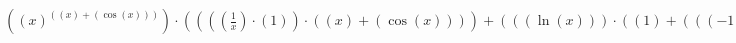 \documentclass{article}
\begin{document}
$((x)^{((x) + (\cos{(x)}))})\cdot((((\frac{1}{x})\cdot(1))\cdot((x) + (\cos{(x)}))) + (((\ln{(x)}))\cdot((1) + (((-1)\cdot(\sin{(x)}))\cdot(1)))))$
\end{document}
